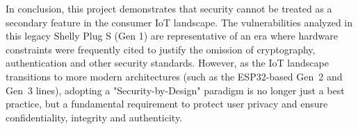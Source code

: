 \medskip
\noindent In conclusion, this project demonstrates that security cannot be treated as a secondary feature in the consumer IoT landscape. The vulnerabilities analyzed in this legacy Shelly Plug S (Gen 1) are representative of an era where hardware constraints were frequently cited to justify the omission of cryptography, authentication and other security standards. However, as the IoT landscape transitions to more modern architectures (such as the ESP32-based Gen~2 and Gen~3 lines), adopting a "Security-by-Design" paradigm is no longer just a best practice, but a fundamental requirement to protect user privacy and ensure confidentiality, integrity and authenticity.